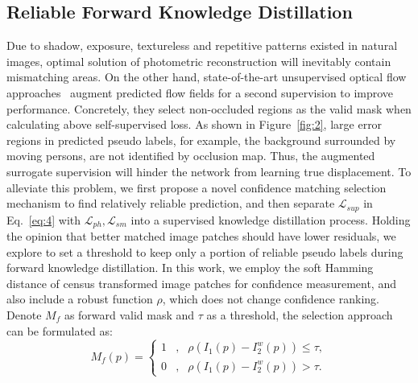 \documentclass[lettersize,journal]{IEEEtran}
\begin{document}
\subsection{Reliable Forward Knowledge Distillation}
Due to shadow, exposure, textureless and repetitive patterns existed in natural images, optimal solution of photometric reconstruction will inevitably contain mismatching areas. On the other hand, state-of-the-art unsupervised optical flow approaches~\cite{Liu_2020_CVPR,10.1007/978-3-030-58536-5_33} augment predicted flow fields for a second supervision to improve performance. Concretely, they select non-occluded regions as the valid mask when calculating above self-supervised loss. As shown in Figure~\ref{fig:2}, large error regions in predicted pseudo labels, for example, the background surrounded by moving persons, are not identified by occlusion map. Thus, the augmented surrogate supervision will hinder the network from learning true displacement. To alleviate this problem, we first propose a novel confidence matching selection mechanism to find relatively reliable prediction, and then separate $\mathcal{L}_{sup}$ in Eq.~\ref{eq:4} with $\mathcal{L}_{ph}, \mathcal{L}_{sm}$ into a supervised knowledge distillation process. Holding the opinion that better matched image patches should have lower residuals, we explore to set a threshold to keep only a portion of reliable pseudo labels during forward knowledge distillation. In this work, we employ the soft Hamming distance of census transformed image patches for confidence measurement, and also include a robust function $\rho$, which does not change confidence ranking. Denote $M_f$ as forward valid mask and $\tau$ as a threshold, the selection approach can be formulated as:
\begin{equation}
	M_f(p)=\left\{
	\begin{aligned}
		1 & , & \rho(I_1(p) - I_2^w(p)) \le \tau, \\
		0 & , & \rho(I_1(p) - I_2^w(p)) > \tau.
	\end{aligned}
	\right.
	\label{eq:5}
\end{equation}
\end{document}
